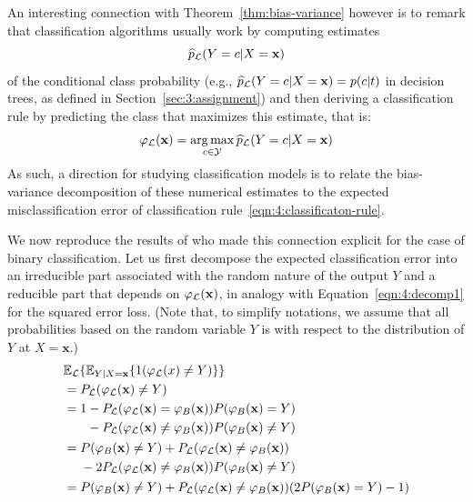 An interesting connection with Theorem~\ref{thm:bias-variance} however is to
remark that classification algorithms usually work by computing estimates
\begin{equation}
\widehat{p}_{\cal L}(Y=c|X=\mathbf{x})
\end{equation}
of the conditional class probability (e.g.,
$\widehat{p}_{\cal L}(Y=c|X=\mathbf{x}) = p(c|t)$ in decision trees, as defined in Section~\ref{sec:3:assignment}) and then deriving a classification rule by
predicting the class that maximizes this estimate, that is:
\begin{equation}\label{eqn:4:classificaton-rule}
\varphi_{\cal L}(\mathbf{x}) = \operatorname*{arg\,max}_{c \in {\cal Y}} \widehat{p}_{\cal L}(Y=c|X=\mathbf{x})
\end{equation}
As such, a direction for studying classification models is to relate the
bias-variance decomposition of these numerical estimates to the expected
misclassification error of classification rule~\ref{eqn:4:classificaton-rule}.

We now reproduce the results of \citet{friedman:1997} who made this connection
explicit for the case of binary classification. Let us first decompose the
expected classification error into an irreducible part associated with the
random nature of the output $Y$ and a reducible part that depends on
$\varphi_{\cal L}(\mathbf{x})$, in analogy with Equation~\ref{eqn:4:decomp1}
for the squared error loss. (Note that, to simplify notations, we assume that
all probabilities based on the random variable $Y$ is with respect to the
distribution of $Y$ at $X=\mathbf{x}$.)
\begin{align}
& \mathbb{E}_{\cal L}\{ \mathbb{E}_{Y|X=\mathbf{x}} \{ 1(\varphi_{\cal L}(x) \neq Y) \} \}  \\
&= P_{{\cal L}}(\varphi_{\cal L}(\mathbf{x}) \neq Y) \nonumber \\
&= \begin{aligned}[t]
    1 &- P_{\cal L}(\varphi_{\cal L}(\mathbf{x}) = \varphi_B(\mathbf{x})) P(\varphi_B(\mathbf{x})=Y) \nonumber \\
      &- P_{\cal L}(\varphi_{\cal L}(\mathbf{x}) \neq \varphi_B(\mathbf{x})) P(\varphi_B(\mathbf{x})\neq Y) \nonumber
   \end{aligned}\nonumber \\
&= \begin{aligned}[t]
    &P(\varphi_B(\mathbf{x})\neq Y) + P_{\cal L}(\varphi_{\cal L}(\mathbf{x})\neq \varphi_B(\mathbf{x})) \nonumber \\
    &- 2 P_{\cal L}(\varphi_{\cal L}(\mathbf{x})\neq \varphi_B(\mathbf{x})) P(\varphi_B(\mathbf{x})\neq Y)  \nonumber \\
   \end{aligned}\nonumber \\
&= P(\varphi_B(\mathbf{x})\neq Y) + P_{\cal L}(\varphi_{\cal L}(\mathbf{x})\neq \varphi_B(\mathbf{x}))(2 P(\varphi_B(\mathbf{x}) = Y) - 1) \nonumber
\end{align}

